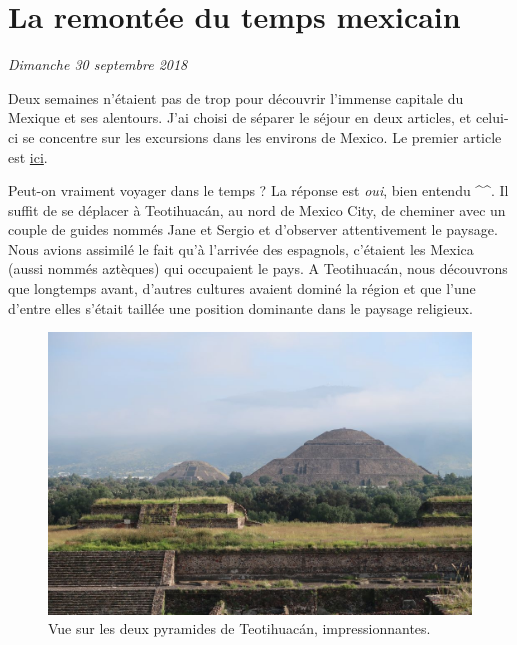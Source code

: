 \hypertarget{la-remontuxe9e-du-temps-mexicain}{%
\section{La remontée du temps
mexicain}\label{la-remontuxe9e-du-temps-mexicain}}

\emph{Dimanche 30 septembre 2018}

Deux semaines n'étaient pas de trop pour découvrir l'immense capitale du
Mexique et ses alentours. J'ai choisi de séparer le séjour en deux
articles, et celui-ci se concentre sur les excursions dans les environs
de Mexico. Le premier article est
\href{/immersion-culturelle-mexico.html}{ici}.

Peut-on vraiment voyager dans le temps ? La réponse est \emph{oui}, bien
entendu \^{}\^{}. Il suffit de se déplacer à Teotihuacán, au nord de
Mexico City, de cheminer avec un couple de guides nommés Jane et Sergio
et d'observer attentivement le paysage. Nous avions assimilé le fait
qu'à l'arrivée des espagnols, c'étaient les Mexica (aussi nommés
aztèques) qui occupaient le pays. A Teotihuacán, nous découvrons que
longtemps avant, d'autres cultures avaient dominé la région et que l'une
d'entre elles s'était taillée une position dominante dans le paysage
religieux.

\begin{figure}
\centering
\includegraphics{images/20180930_teotihuacan.JPG}
\caption{Vue sur les deux pyramides de Teotihuacán, impressionnantes.}
\end{figure}

